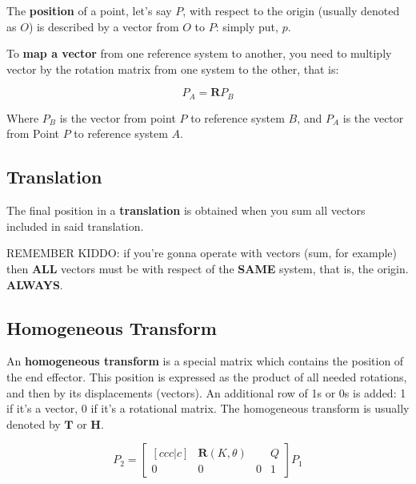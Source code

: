 \documentclass[titlepage, letterpaper, fleqn]{article}
\newcommand{\spacepls}{\vspace{5mm}}
\let\bs\mathbf
\begin{document}
The \textbf{position} of a point, let's say $P$,
with respect to the origin (usually denoted as $O$)
is described by a vector from $O$ to $P$:
simply put, $p$.

To \textbf{map a vector} from one reference system to another,
you need to multiply vector by the rotation matrix from one system to the other, that is:

\begin{equation}
    \label{eq:vector_mapping}
    P_A = \bs{R}P_B
\end{equation}

Where $P_B$ is the vector from point $P$ to reference system $B$,
and $P_A$ is the vector from Point $P$ to reference system $A$.


\subsection{Translation} %
\label{subsec:translation}

The final position in a \textbf{translation} is obtained when you sum all vectors included in said translation.

\spacepls

\begin{tcolorbox}
REMEMBER KIDDO: if you're gonna operate with vectors (sum, for example) then \textbf{ALL} vectors must be with respect of the \textbf{SAME} system, that is, the origin. \textbf{ALWAYS}.
\end{tcolorbox}


\subsection{Homogeneous Transform} %
\label{subsec:homogeneous_transform}

An \textbf{homogeneous transform} is a special matrix which contains the position of the end effector.
This position is expressed as the product of all needed rotations,
and then by its displacements (vectors).
An additional row of 1s or 0s is added: 1 if it's a vector, 0 if it's a rotational matrix.
The homogeneous transform is usually denoted by $\bs{T}$ or $\bs{H}$.

\begin{equation}
    \label{eq:transform_general}
    P_2 = \begin{bmatrix}[ccc|c]
    & \bs{R}(K,\theta) & & Q \\ \hline
    0 & 0 & 0 & 1
    \end{bmatrix} P_1
\end{equation}
\end{document}
